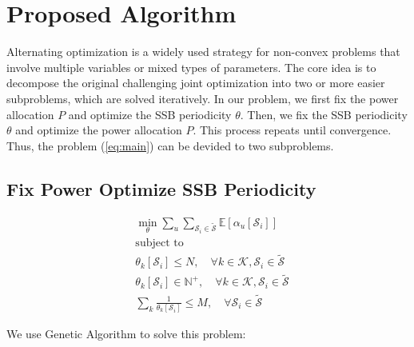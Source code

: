 \chapter{Proposed Algorithm}
\label{chap:algorithm}
Alternating optimization is a widely used strategy for non-convex problems that involve multiple variables or mixed types of parameters. The core idea is to decompose the original challenging joint optimization into two or more easier subproblems, which are solved iteratively. In our problem, we first fix the power allocation $P$ and optimize the SSB periodicity $\theta$. Then, we fix the SSB periodicity $\theta$ and optimize the power allocation $P$. This process repeats until convergence. Thus, the problem (\ref{eq:main}) can be devided to two subproblems. 

\section{Fix Power Optimize SSB Periodicity}

\begin{subequations} \label{eq:FPOS}
\begin{align}
    &\min_{\theta} \sum_{u} \sum_{\mathcal{S}_i\in \mathcal{\widetilde{S}}} \mathbb{E}[\alpha_u[\mathcal{S}_i]] \\ 
    &\text{subject to} \nonumber \\
    &\theta_k[\mathcal{S}_i] \leq N, \quad \forall k\in\mathcal{K}, \mathcal{S}_i\in\mathcal{\widetilde{S}} \\
    &\theta_k[\mathcal{S}_i] \in \mathbb{N}^+, \quad \forall k\in\mathcal{K}, \mathcal{S}_i\in\mathcal{\widetilde{S}} \\
    &\sum_k \frac{1}{\theta_k[\mathcal{S}_i]} \leq M, \quad \forall \mathcal{S}_i\in\mathcal{\widetilde{S}}
\end{align}
\end{subequations}

We use Genetic Algorithm to solve this problem:

